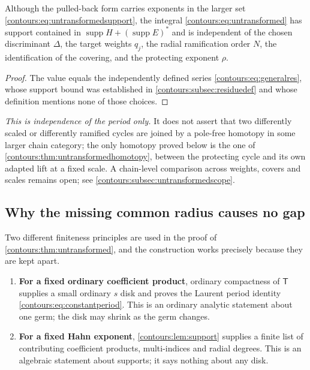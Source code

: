 \documentclass[11pt,letterpaper]{article}
\theoremstyle{definition}
\theoremstyle{remark}
\newcommand{\supp}{\operatorname{supp}}\newcommand{\Res}{\operatorname{Res}}
\numberwithin{equation}{section}
\begin{document}
\begin{corollary}
\label{contours:cor:scalecancel}
Although the pulled-back form carries exponents in the larger set
\eqref{contours:eq:untransformedsupport}, the integral
\eqref{contours:eq:untransformed} has support contained in $\supp H+(\supp E)^*$
and is independent of the chosen discriminant $\Delta$, the target weights
$q_j$, the radial ramification order $N$, the identification of the covering,
and the protecting exponent $\rho$.
\end{corollary}
\begin{proof}
The value equals the independently defined series
\eqref{contours:eq:generalres}, whose support bound was established in
\cref{contours:subsec:residuedef} and whose definition mentions none of those
choices.
\end{proof}

\emph{This is independence of the period only.} It does not assert that two
differently scaled or differently ramified cycles are joined by a pole-free
homotopy in some larger chain category; the only homotopy proved below is the
one of \cref{contours:thm:untransformedhomotopy}, between the protecting cycle
and its own adapted lift at a fixed scale. A chain-level comparison across
weights, covers and scales remains open; see
\cref{contours:subsec:untransformedscope}.

\subsection{Why the missing common radius causes no gap}
\label{contours:subsec:tworadii}
Two different finiteness principles are used in the proof of
\cref{contours:thm:untransformed}, and the construction works precisely because
they are kept apart.

\begin{enumerate}
\item \textbf{For a fixed ordinary coefficient product}, ordinary compactness of
$\mathsf T$ supplies a small ordinary $s$ disk and proves the Laurent period
identity \eqref{contours:eq:constantperiod}. This is an ordinary analytic
statement about one germ; the disk may shrink as the germ changes.
\item \textbf{For a fixed Hahn exponent}, \cref{contours:lem:support} supplies a
finite list of contributing coefficient products, multi-indices and radial
degrees. This is an algebraic statement about supports; it says nothing about
any disk.
\end{enumerate}
\end{document}
